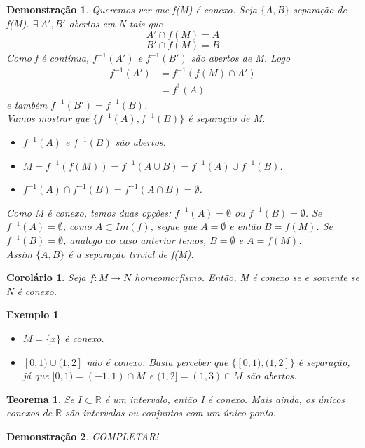 \documentclass{article}
\newtheorem*{theorem}{Teorema}
\newtheorem{corolario}{Corolário}
\newtheorem*{exemplo}{Exemplo}
\newtheorem*{prova}{Demonstração}
\newcommand{\R}{\mathbb{R}}
\begin{document}
\begin{prova}
    Queremos ver que f(M) é conexo. Seja $\{A, B\}$ separação de f(M).
    $\exists \: A', B'$ abertos em N tais que 
    \[A' \cap f(M) = A\]
    \[B' \cap f(M) = B\]
    Como f é contínua, $f^{-1}(A')$ e $f^{-1}(B')$ são abertos de M.
    Logo
    \begin{align*}
        f^{-1}(A') &= f^{-1}(f(M) \cap A') \\
                   &= f^{1}(A) 
    \end{align*}
    e também $f^{-1}(B') = f^{-1}(B)$.\\
    Vamos mostrar que $\{f^{-1}(A), f^{-1}(B)\}$ é separação de M.
    \begin{itemize}
        \item $f^{-1}(A)$ e $f^{-1}(B)$ são abertos.
        \item $M = f^{-1}(f(M)) = f^{-1}(A \cup B) = f^{-1}(A) \cup f^{-1}(B)$.
        \item $f^{-1}(A) \cap f^{-1}(B) = f^{-1}(A \cap B) = \emptyset$.
    \end{itemize}
    Como M é conexo, temos duas opções: $f^{-1}(A) = \emptyset$ ou $f^{-1}(B) = \emptyset$.
    Se $f^{-1}(A) = \emptyset$, como $A \subset Im(f)$, segue que $A = \emptyset$ e então $B = f(M)$.
    Se $f^{-1}(B) = \emptyset$, analogo ao caso anterior temos, $B = \emptyset$ e $A = f(M)$.\\
    Assim $\{A, B\}$ é a separação trivial de f(M).
\end{prova}

\begin{corolario}
    Seja $f: M \rightarrow N$ homeomorfismo. Então, M é conexo se e somente se N é conexo.
\end{corolario}

\begin{exemplo}
    \
    \begin{itemize}
        \item $M = \{x\}$ é conexo.
        \item $[0, 1) \cup (1, 2]$ não é conexo. Basta perceber que $\{[0, 1), (1, 2]\}$ é separação, já que
            $[0, 1) = (-1, 1) \cap M$ e $(1, 2] = (1, 3) \cap M$ são abertos. 
    \end{itemize}
\end{exemplo}

\begin{theorem}
    Se $I \subset \R$ é um intervalo, então I é conexo. Mais ainda, os únicos conexos de $\R$ são intervalos ou conjuntos com um único ponto.
\end{theorem}

\begin{prova}
    COMPLETAR!
\end{prova}
\end{document}
